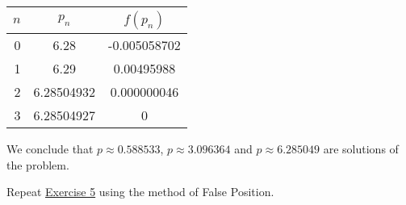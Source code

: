 \documentclass[../../../../Assignments]{subfiles}
\begin{document}
\begin{solution}
\begin{enumerate}[label = \alph*)]
            \begin{table}[H]
                \centering
                \begin{tabular}{r S[table-format=1.8] S[table-format=-1.9]}
                    \toprule
                    \(n\)  &   {\(p_n\)}   &  {\(f(p_n)\)}  \\
                      &  6.28         &  -0.005058702  \\
                        1  &  6.29         &   0.00495988   \\
                        2  &  6.28504932   &   0.000000046  \\
                        3  &  6.28504927   &   0            \\
                    \bottomrule
                \end{tabular}
            \end{table}

            We conclude that \(p \approx \num{0.588533}\), \(p \approx
            \num{3.096364}\) and \(p \approx \num{6.285049}\) are solutions of
            the problem.
    \end{enumerate}
\end{solution}

\begin{exercise}
    Repeat \hyperref[exer:2.3.5]{Exercise 5} using the method of False Position.
\end{exercise}
\end{document}
